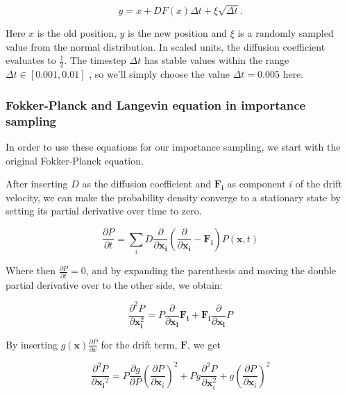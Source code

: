 \documentclass[
]{article}
\begin{document}
\begin{equation} y=x+D F(x) \Delta t+\xi \sqrt{\Delta t} .\label{eq:euler_method}\end{equation}

Here \(x\) is the old position, \(y\) is the new position and \(\xi\) is
a randomly sampled value from the normal distribution. In scaled units,
the diffusion coefficient evaluates to \(\frac{1}{2}\). The timestep
\(\Delta t\) has stable values within the range
\(\Delta t \in [0.001, 0.01]\) , so we'll simply choose the value
\(\Delta t = 0.005\) here.

\hypertarget{fokker-planck-and-langevin-equation-in-importance-sampling}{%
\subsubsection{Fokker-Planck and Langevin equation in importance
sampling}\label{fokker-planck-and-langevin-equation-in-importance-sampling}}

In order to use these equations for our importance sampling, we start
with the original Fokker-Planck equation.

After inserting \(D\) as the diffusion coefficient and
\(\mathbf{F}_{\mathbf{i}}\) as component \(i\) of the drift velocity, we
can make the probability density converge to a stationary state by
setting its partial derivative over time to zero.

\[ \frac{\partial P}{\partial t}=\sum_{i} D \frac{\partial}{\partial \mathbf{x}_{\mathbf{i}}}\left(\frac{\partial}{\partial \mathbf{x}_{\mathbf{i}}}-\mathbf{F}_{\mathbf{i}}\right) P(\mathbf{x}, t) \]

Where then \(\frac{\partial P}{\partial t}= 0\), and by expanding the
parenthesis and moving the double partial derivative over to the other
side, we obtain:

\[ \frac{\partial^{2} P}{\partial \mathbf{x}_{\mathbf{i}}^{2}}=P \frac{\partial}{\partial \mathbf{x}_{\mathbf{i}}} \mathbf{F}_{\mathbf{i}}+\mathbf{F}_{\mathbf{i}} \frac{\partial}{\partial \mathbf{x}_{\mathbf{i}}} P \]

By inserting \(g(\mathbf{x}) \frac{\partial P}{\partial x}\) for the
drift term, \(\mathbf{F}\), we get

\[ \frac{\partial^{2} P}{\partial \mathbf{x} _{\mathbf{i}}{}^{2}}=P \frac{\partial g}{\partial P}\left(\frac{\partial P}{\partial \mathbf{x}_{i}}\right)^{2}+P g \frac{\partial^{2} P}{\partial \mathbf{x}_{i}^{2}}+g\left(\frac{\partial P}{\partial \mathbf{x}_{i}}\right)^{2} \]
\end{document}
